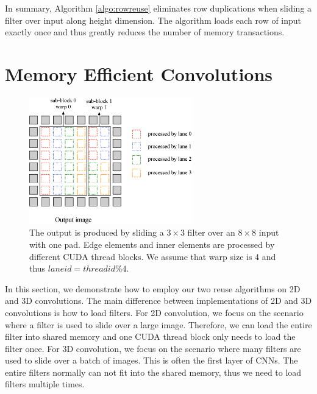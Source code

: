 \documentclass[sigplan,review,anonymous]{acmart}\settopmatter{printfolios=true,printccs=false,printacmref=false}
\begin{document}
In summary, Algorithm \ref{algo:rowreuse} eliminates row duplications when sliding a filter over input along height dimension. The algorithm loads each row of input exactly once and thus greatly reduces the number of memory transactions.
 
\section{Memory Efficient Convolutions}
\begin{figure}
	\centering
	\includegraphics[width=0.9\columnwidth,height=5.5cm]{./figure/overalldesign.eps}
\caption{The output is produced by sliding a $3 \times 3$ filter over an $8 \times 8$ input with one pad. Edge elements and inner elements are processed by different CUDA thread blocks. We assume that warp size is 4 and thus $laneid=threadid\%4$.}
\label{fig:overalldesign}
\end{figure}


In this section, we demonstrate how to employ our two reuse algorithms on 2D and 3D convolutions. The main difference between implementations of 2D and 3D convolutions is how to load filters. For 2D convolution, we focus on the scenario where a filter is used to slide over a large image. Therefore, we can load the entire filter into shared memory and one CUDA thread block only needs to load the filter once. For 3D convolution, we focus on the scenario where many filters are used to slide over a batch of images. This is often the first layer of CNNs. The entire filters normally can not fit into the shared memory, thus we need to load filters multiple times.
\end{document}

